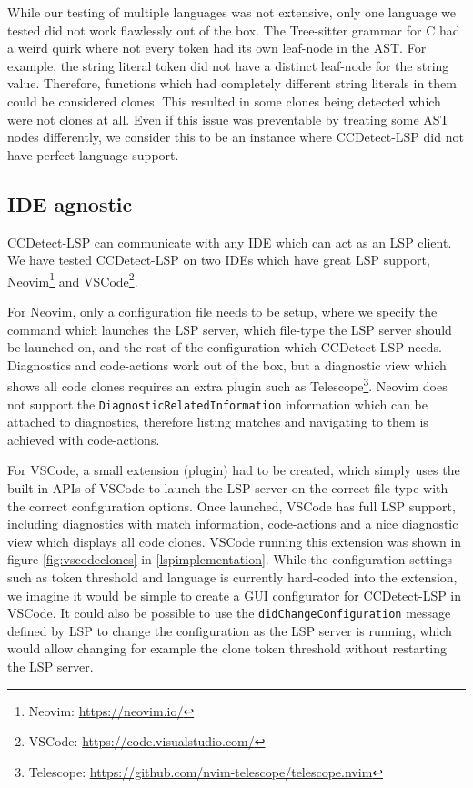 While our testing of multiple languages was not extensive, only one language we tested did
not work flawlessly out of the box. The Tree-sitter grammar for C had a weird quirk where
not every token had its own leaf-node in the AST. For example, the string literal token
did not have a distinct leaf-node for the string value. Therefore, functions which had
completely different string literals in them could be considered clones. This resulted in
some clones being detected which were not clones at all. Even if this issue was
preventable by treating some AST nodes differently, we consider this to be an instance
where CCDetect-LSP did not have perfect language support.

\subsection*{IDE agnostic}

CCDetect-LSP can communicate with any IDE which can act as an LSP client. We have tested
CCDetect-LSP on two IDEs which have great LSP support, Neovim\footnote{Neovim:
\url{https://neovim.io/}} and VSCode\footnote{VSCode:
\url{https://code.visualstudio.com/}}. 

For Neovim, only a configuration file needs to be setup, where we specify the command
which launches the LSP server, which file-type the LSP server should be launched on, and
the rest of the configuration which CCDetect-LSP needs. Diagnostics and code-actions work
out of the box, but a diagnostic view which shows all code clones requires an extra plugin
such as Telescope\footnote{Telescope:
\url{https://github.com/nvim-telescope/telescope.nvim}}. Neovim does not support the
\verb|DiagnosticRelatedInformation| information which can be attached to diagnostics,
therefore listing matches and navigating to them is achieved with code-actions.

For VSCode, a small extension (plugin) had to be created, which simply uses the built-in
APIs of VSCode to launch the LSP server on the correct file-type with the correct
configuration options. Once launched, VSCode has full LSP support, including diagnostics
with match information, code-actions and a nice diagnostic view which displays all code
clones. VSCode running this extension was shown in figure \ref{fig:vscodeclones} in
\cref{lspimplementation}. While the configuration settings such as token threshold and
language is currently hard-coded into the extension, we imagine it would be simple to
create a GUI configurator for CCDetect-LSP in VSCode. It could also be possible to use the
\verb|didChangeConfiguration| message defined by LSP to change the configuration as the
LSP server is running, which would allow changing for example the clone token threshold
without restarting the LSP server. 
